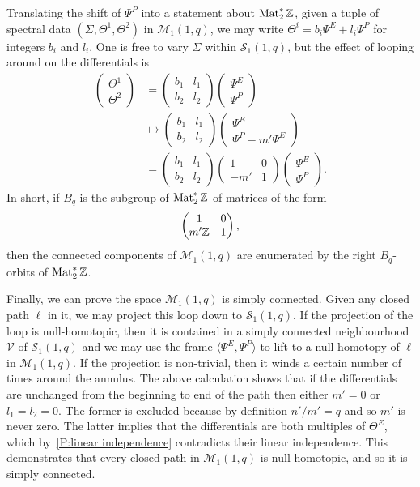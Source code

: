 Translating the shift of $Ψ^P$ into a statement about $\Mat_2^*\Z$, given a tuple of spectral data $(Σ,Θ^1,Θ^2)$ in $\mathcal{M}_1(1,q)$, we may write $Θ^i = b_i Ψ^E + l_i Ψ^P$ for integers $b_i$ and $l_i$. One is free to vary $Σ$ within $\mathcal{S}_1(1,q)$, but the effect of looping around on the differentials is
\begin{align*}
\begin{pmatrix}
Θ^1 \\ Θ^2
\end{pmatrix}
&=
\begin{pmatrix}
b_1 & l_1 \\
b_2 & l_2
\end{pmatrix}
\begin{pmatrix}
Ψ^E \\ Ψ^P
\end{pmatrix} \\
&\mapsto
\begin{pmatrix}
b_1 & l_1 \\
b_2 & l_2
\end{pmatrix}
\begin{pmatrix}
    Ψ^E \\ Ψ^P - m' Ψ^E
    \end{pmatrix} \\
&=
\begin{pmatrix}
b_1 & l_1 \\
b_2 & l_2
\end{pmatrix}
\begin{pmatrix}
    1 & 0 \\
    -m' & 1
\end{pmatrix}
\begin{pmatrix}
    Ψ^E \\ Ψ^P
    \end{pmatrix}.
\end{align*}
In short, if $B_q$ is the subgroup of $\Mat_2^*\Z$ of matrices of the form
\[
\begin{pmatrix}
1 & 0 \\
m'\Z & 1
\end{pmatrix},
\]
then the connected components of $\mathcal{M}_1(1,q)$ are enumerated by the right $B_q$-orbits of $\Mat_2^*\Z$.

Finally, we can prove the space $\mathcal{M}_1(1,q)$ is simply connected. Given any closed path $\ell$ in it, we may project this loop down to $\mathcal{S}_1(1,q)$. If the projection of the loop is null-homotopic, then it is contained in a simply connected neighbourhood $\mathcal{V}$ of $\mathcal{S}_1(1,q)$ and we may use the frame $\langle Ψ^E,Ψ^P \rangle$ to lift to a null-homotopy of $\ell$ in $\mathcal{M}_1(1,q)$. If the projection is non-trivial, then it winds a certain number of times around the annulus. The above calculation shows that if the differentials are unchanged from the beginning to end of the path then either $m' = 0$ or $l_1=l_2 = 0$. The former is excluded because by definition $n'/m' = q$ and so $m'$ is never zero. The latter implies that the differentials are both multiples of $Θ^E$, which by~\ref{P:linear independence} contradicts their linear independence. This demonstrates that every closed path in $\mathcal{M}_1(1,q)$ is null-homotopic, and so it is simply connected.


